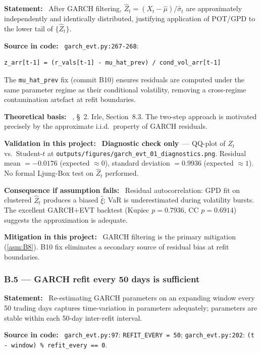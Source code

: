 \documentclass[11pt,a4paper]{article}
\newcommand{\asmfield}[1]{\medskip\noindent\textbf{#1:}\ }
\newcommand{\code}[1]{\texttt{#1}}
\newcommand{\diagnostic}{\textbf{Diagnostic check only}}
\begin{document}
\asmfield{Statement}
After GARCH filtering, $\hat{Z}_t = (X_t - \hat{\mu})/\hat{\sigma}_t$
are approximately independently and identically distributed, justifying
application of POT/GPD to the lower tail of $\{\hat{Z}_t\}$.

\asmfield{Source in code}
\code{garch\_evt.py:267-268}:
\begin{lstlisting}
z_arr[t-1] = (r_vals[t-1] - mu_hat_prev) / cond_vol_arr[t-1]
\end{lstlisting}
The \code{mu\_hat\_prev} fix (commit B10) ensures residuals are computed
under the same parameter regime as their conditional volatility, removing
a cross-regime contamination artefact at refit boundaries.

\asmfield{Theoretical basis}
\cite{McNeilFrey2000}, \S~2. Irle, Section~8.3. The two-step approach is
motivated precisely by the approximate i.i.d.\ property of GARCH residuals.

\asmfield{Validation in this project}
\diagnostic\ --- QQ-plot of $\hat{Z}_t$ vs.\ Student-$t$ at
\code{outputs/figures/garch\_evt\_01\_diagnostics.png}. Residual mean
$= -0.0176$ (expected $\approx 0$), standard deviation $= 0.9936$
(expected $\approx 1$). No formal Ljung-Box test on $\hat{Z}_t$ performed.

\asmfield{Consequence if assumption fails}
Residual autocorrelation: GPD fit on clustered $\hat{Z}_t$ produces a
biased $\hat{\xi}$; VaR is underestimated during volatility bursts. The
excellent GARCH+EVT backtest (Kupiec $p = 0.7936$, CC $p = 0.6914$)
suggests the approximation is adequate.

\asmfield{Mitigation in this project}
GARCH filtering is the primary mitigation (\cref{asm:B8}). B10 fix
eliminates a secondary source of residual bias at refit boundaries.

\subsubsection{B.5 --- GARCH refit every 50 days is sufficient}\label{asm:B5}

\asmfield{Statement}
Re-estimating GARCH parameters on an expanding window every 50 trading
days captures time-variation in parameters adequately; parameters are
stable within each 50-day inter-refit interval.

\asmfield{Source in code}
\code{garch\_evt.py:97}: \lstinline|REFIT_EVERY = 50|;
\code{garch\_evt.py:202}: \lstinline|(t - window) % refit_every == 0|.
\end{document}
